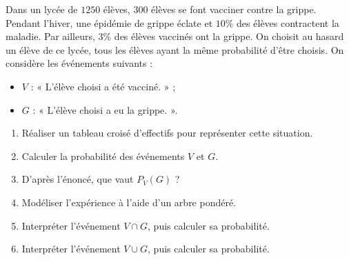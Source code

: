 \documentclass[11pt]{article}
\begin{document}
\begin{exo}
  Dans un lycée de $1250$ élèves, $300$ élèves se font vacciner contre la
  grippe. Pendant l'hiver, une épidémie de grippe éclate et $10$\% des élèves
  contractent la maladie. Par ailleurs, $3$\% des élèves vaccinés ont la grippe.
  On choisit au hasard un élève de ce lycée, tous les élèves ayant la même
  probabilité d'être choisis. On considère les événements suivants :
  \begin{itemize}
    \item $V$ : « L'élève choisi a été vacciné. » ;
    \item $G$ : « L'élève choisi a eu la grippe. ».
  \end{itemize}
  \begin{enumerate}
    \item Réaliser un tableau croisé d'effectifs pour représenter cette
      situation.
    \item Calculer la probabilité des événements $V$ et $G$.
    \item D'après l'énoncé, que vaut $P_V(G)$ ?
    \item Modéliser l'expérience à l'aide d'un arbre pondéré.
    \item Interpréter l'événement $V\cap G$, puis calculer sa probabilité.
    \item Interpréter l'événement $V\cup G$, puis calculer sa probabilité.
  \end{enumerate}
\end{exo}
\end{document}
